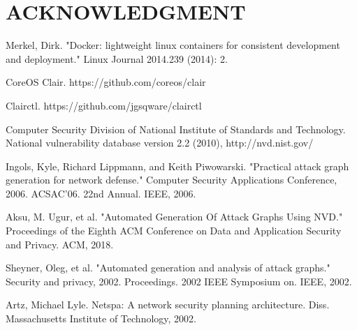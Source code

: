 \documentclass[letterpaper, 10 pt, conference]{ieeeconf}  %
\begin{document}

\section*{ACKNOWLEDGMENT}







\begin{thebibliography}{99}

 Merkel, Dirk. "Docker: lightweight linux containers for consistent development and deployment." Linux Journal 2014.239 (2014): 2.

  CoreOS Clair. https://github.com/coreos/clair

  Clairctl. https://github.com/jgsqware/clairctl

  Computer Security Division of National Institute of Standards and Technology.
National vulnerability database version 2.2 (2010),
http://nvd.nist.gov/

  Ingols, Kyle, Richard Lippmann, and Keith Piwowarski. "Practical attack graph generation for network defense." Computer Security Applications Conference, 2006. ACSAC'06. 22nd Annual. IEEE, 2006.

  Aksu, M. Ugur, et al. "Automated Generation Of Attack Graphs Using NVD." Proceedings of the Eighth ACM Conference on Data and Application Security and Privacy. ACM, 2018.

  Sheyner, Oleg, et al. "Automated generation and analysis of attack graphs." Security and privacy, 2002. Proceedings. 2002 IEEE Symposium on. IEEE, 2002.

  Artz, Michael Lyle. Netspa: A network security planning architecture. Diss. Massachusetts Institute of Technology, 2002.
\end{thebibliography}
\end{document}

